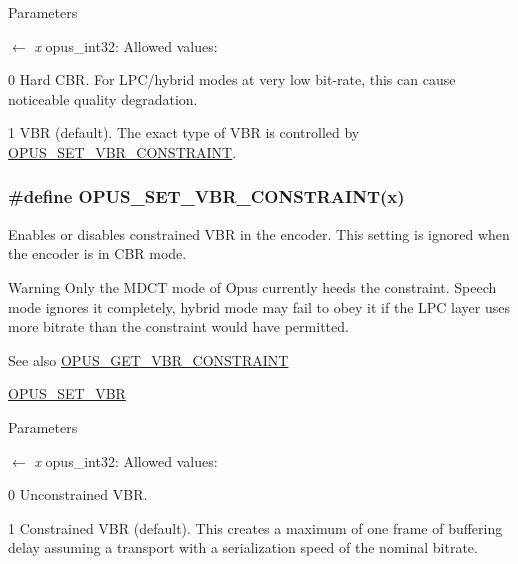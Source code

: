 \begin{DoxyParams}{Parameters}
\item[\mbox{$\leftarrow$} {\em x}]{\ttfamily opus\_\-int32}: Allowed values: 
\begin{DoxyDescription}
\item[0]Hard CBR. For LPC/hybrid modes at very low bit-\/rate, this can cause noticeable quality degradation. 
\item[1]VBR (default). The exact type of VBR is controlled by \hyperlink{group__opus__encoderctls_gab1b534a4fe55373f1be407ad4b2b22bd}{OPUS\_\-SET\_\-VBR\_\-CONSTRAINT}. 
\end{DoxyDescription}\end{DoxyParams}
\hypertarget{group__opus__encoderctls_gab1b534a4fe55373f1be407ad4b2b22bd}{
\subsubsection[{OPUS\_\-SET\_\-VBR\_\-CONSTRAINT}]{\setlength{\rightskip}{0pt plus 5cm}\#define OPUS\_\-SET\_\-VBR\_\-CONSTRAINT(x)}}
\label{group__opus__encoderctls_gab1b534a4fe55373f1be407ad4b2b22bd}


Enables or disables constrained VBR in the encoder. This setting is ignored when the encoder is in CBR mode. \begin{DoxyWarning}{Warning}
Only the MDCT mode of Opus currently heeds the constraint. Speech mode ignores it completely, hybrid mode may fail to obey it if the LPC layer uses more bitrate than the constraint would have permitted. 
\end{DoxyWarning}
\begin{DoxySeeAlso}{See also}
\hyperlink{group__opus__encoderctls_gab35fa5691ba0dd932031b7839c47513c}{OPUS\_\-GET\_\-VBR\_\-CONSTRAINT} 

\hyperlink{group__opus__encoderctls_ga34d09ae06cab7e1a6c49876249b67892}{OPUS\_\-SET\_\-VBR} 
\end{DoxySeeAlso}

\begin{DoxyParams}{Parameters}
\item[\mbox{$\leftarrow$} {\em x}]{\ttfamily opus\_\-int32}: Allowed values: 
\begin{DoxyDescription}
\item[0]Unconstrained VBR. 
\item[1]Constrained VBR (default). This creates a maximum of one frame of buffering delay assuming a transport with a serialization speed of the nominal bitrate. 
\end{DoxyDescription}\end{DoxyParams}

